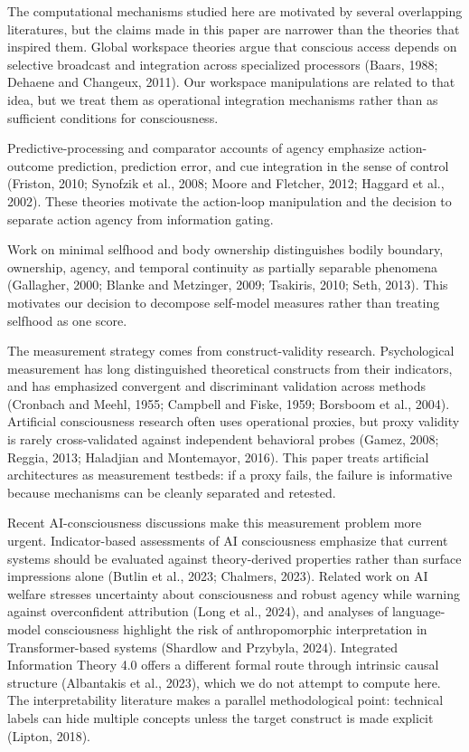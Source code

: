 \documentclass[
  11pt,
  letterpaper,
]{article}
\begin{document}
The computational mechanisms studied here are motivated by several
overlapping literatures, but the claims made in this paper are narrower
than the theories that inspired them. Global workspace theories argue
that conscious access depends on selective broadcast and integration
across specialized processors (Baars, 1988; Dehaene and Changeux, 2011).
Our workspace manipulations are related to that idea, but we treat them
as operational integration mechanisms rather than as sufficient
conditions for consciousness.

Predictive-processing and comparator accounts of agency emphasize
action-outcome prediction, prediction error, and cue integration in the
sense of control (Friston, 2010; Synofzik et al., 2008; Moore and
Fletcher, 2012; Haggard et al., 2002). These theories motivate the
action-loop manipulation and the decision to separate action agency from
information gating.

Work on minimal selfhood and body ownership distinguishes bodily
boundary, ownership, agency, and temporal continuity as partially
separable phenomena (Gallagher, 2000; Blanke and Metzinger, 2009;
Tsakiris, 2010; Seth, 2013). This motivates our decision to decompose
self-model measures rather than treating selfhood as one score.

The measurement strategy comes from construct-validity research.
Psychological measurement has long distinguished theoretical constructs
from their indicators, and has emphasized convergent and discriminant
validation across methods (Cronbach and Meehl, 1955; Campbell and Fiske,
1959; Borsboom et al., 2004). Artificial consciousness research often
uses operational proxies, but proxy validity is rarely cross-validated
against independent behavioral probes (Gamez, 2008; Reggia, 2013;
Haladjian and Montemayor, 2016). This paper treats artificial
architectures as measurement testbeds: if a proxy fails, the failure is
informative because mechanisms can be cleanly separated and retested.

Recent AI-consciousness discussions make this measurement problem more
urgent. Indicator-based assessments of AI consciousness emphasize that
current systems should be evaluated against theory-derived properties
rather than surface impressions alone (Butlin et al., 2023; Chalmers,
2023). Related work on AI welfare stresses uncertainty about
consciousness and robust agency while warning against overconfident
attribution (Long et al., 2024), and analyses of language-model
consciousness highlight the risk of anthropomorphic interpretation in
Transformer-based systems (Shardlow and Przybyla, 2024). Integrated
Information Theory 4.0 offers a different formal route through intrinsic
causal structure (Albantakis et al., 2023), which we do not attempt to
compute here. The interpretability literature makes a parallel
methodological point: technical labels can hide multiple concepts unless
the target construct is made explicit (Lipton, 2018).
\end{document}
